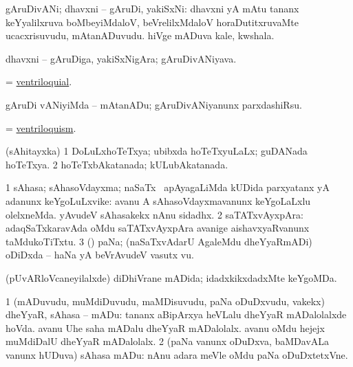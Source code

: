 \bentry
{} 
\gl{\nA}
\expl{}
\bmng
 gAruDivANi; dhavxni -- gAruDi, yakiSxNi: 
\banum
{} dhavxni yA mAtu tananx keYyalilxruva boMbeyiMdaloV, beVrelilxMdaloV horaDutitxruvaMte ucacxrisuvudu, mAtanADuvudu. 
 hiVge mADuva kale, kwshala. 
\eanum
\emng
\eentry

\bentry
{} 
\gl{\nA}
\expl{}
\bmng
 dhavxni -- gAruDiga, yakiSxNigAra; gAruDivANiyava. 
\emng
\eentry

\bentry
{} 
\gl{\gu}
\expl{}
\bmng
 = \hyperlink{ventriloquial}{ventriloquial}. 
\emng
\eentry

\bentry
{} 
\gl{\akirx}
\expl{}
\bmng
 gAruDi vANiyiMda -- mAtanADu; gAruDivANiyanunx parxdashiRsu. 
\emng
\eentry

\bentry
{} 
\gl{\nA}
\expl{}
\bmng
 = \hyperlink{ventriloquism}{ventriloquism}. 
\emng
\eentry

\bentry
{} 
\gl{\gu}
\expl{}
\bmng
 (sAhitayxka) 
\bnum
\num{1} DoLuLxhoTeTxya; ubibxda hoTeTxyuLaLx; guDANada hoTeTxya. 
\num{2} hoTeTxbAkatanada; kULubAkatanada. 
\enum
\emng
\eentry

\bentry
{} 
\gl{\nA}
\expl{}
\bmng
\bnum
\num{1} sAhasa; sAhasoVdayxma; naSaTx \mo\ apAyagaLiMda kUDida parxyatanx yA adanunx keYgoLuLxvike:  avanu A sAhasoVdayxmavanunx keYgoLaLxlu olelxneMda.  yAvudeV sAhasakekx nAnu sidadhx. 
\num{2} saTATxvAyxpAra:  adaqSaTxkaravAda oMdu saTATxvAyxpAra avanige aishavxyaRvanunx taMdukoTiTxtu. 
\num{3} (\pArxparx) paNa; (naSaTxvAdarU AgaleMdu dheYyaRmADi) oDiDxda -- haNa yA beVrAvudeV vasutx \mo vu. 
\enum
\emng

\noindent 
\gl{\pagu}
\expl{}
\bmng
  (pUvARloVcaneyilalxde) diDhiVrane mADida; idadxkikxdadxMte keYgoMDa. 
\emng
\eentry

\bentry
{} 
\gl{\sakirx}
\expl{}
\bmng
\bnum
\num{1} (mADuvudu, muMdiDuvudu, maMDisuvudu, paNa oDuDxvudu, \mo vakekx) dheYyaR, sAhasa -- mADu:  tananx aBipArxya heVLalu dheYyaR mADalolalxde hoVda.  avanu Uhe saha mADalu dheYyaR mADalolalx.  avanu oMdu hejejx muMdiDalU dheYyaR mADalolalx. 
\num{2} (paNa \mo vanunx oDuDxva, baMDavALa \mo vanunx hUDuva) sAhasa mADu:  nAnu adara meVle oMdu paNa oDuDxtetxVne. 
\enum
\emng

